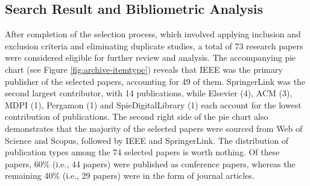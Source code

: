 \subsection{Search Result and Bibliometric Analysis}

After completion of the selection process, which involved applying inclusion and exclusion criteria and eliminating duplicate studies, a total of 73 research papers were considered eligible for further review and analysis. The accompanying pie chart (see Figure \ref{fig:archive-itemtype}) reveals that IEEE was the primary publisher of the selected papers, accounting for 49 of them. SpringerLink was the second largest contributor, with 14 publications, while Elsevier (4), ACM (3), MDPI (1), Pergamon (1) and SpieDigitalLibrary (1) each account for the lowest contribution of publications. The second right side of the pie chart also demonstrates that the majority of the selected papers were sourced from Web of Science and Scopus, followed by IEEE and SpringerLink. The distribution of publication types among the 74 selected papers is worth nothing. Of these papers, 60\% (i.e., 44 papers) were published as conference papers, whereas the remaining 40\% (i.e., 29 papers) were in the form of journal articles.



% 
% 

